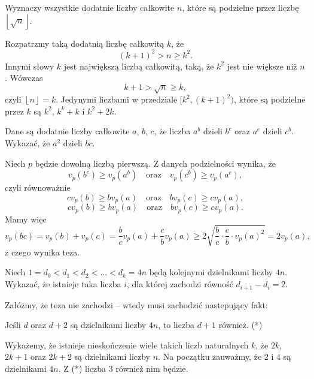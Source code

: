 \newpage
{}

\begin{problem}{1}
	Wyznaczy wszystkie dodatnie liczby całkowite $n$, które są podzielne przez liczbę~$\left\lfloor \sqrt{n} \right\rfloor$.
\end{problem}


\noindent
Rozpatrzmy taką dodatnią liczbę całkowitą $k$, że
\[
	(k + 1)^2 > n \geqslant k^2.
\]
Innymi słowy $k$ jest największą liczbą całkowitą, taką, że $k^2$ jest nie większe niż $n$. Wówczas
\[
	k + 1 > \sqrt{n} \geqslant k,
\]
czyli $\left\lfloor n \right\rfloor = k$. Jedynymi liczbami w przedziale $[k^2, (k + 1)^2)$, które są podzielne przez $k$ są $k^2$, $k^k + k$ i $k^2 + 2k$.


\begin{problem}{2}
	Dane są dodatnie liczby całkowite $a$, $b$, $c$, że liczba $a^b$ dzieli $b^c$ oraz $a^c$ dzieli $c^b$. Wykazać, że $a^2$ dzieli $bc$.
\end{problem}

\noindent
Niech $p$ będzie dowolną liczbą pierwszą.
Z danych podzielności wynika, że
\[
	v_p(b^c) \geqslant v_p(a^b) \quad \text{oraz} \quad v_p(c^b) \geqslant v_p(a^c),
\]
czyli równoważnie
\[
	cv_p(b) \geqslant bv_p(a) \quad \text{oraz} \quad bv_p(c) \geqslant cv_p(a),
\]
\[
	cv_p(b) \geqslant bv_p(a) \quad \text{oraz} \quad bv_p(c) \geqslant cv_p(a).
\]
Mamy więc
\[
	v_p(bc) = v_p(b) + v_p(c) = \frac{b}{c}v_p(a) +  \frac{c}{b}v_p(a) \geqslant 2\sqrt{\frac{b}{c} \cdot \frac{c}{b} \cdot v_p(a)^2} = 2v_p(a),
\]
z czego wynika teza.


\begin{problem}{3}
	Niech $1 = d_0 < d_1 < d_2 < ... < d_k = 4n$ będą kolejnymi dzielnikami liczby $4n$. Wykazać, że istnieje taka liczba $i$, dla której zachodzi równość $d_{i + 1} - d_i = 2$.
\end{problem}

\noindent
Załóżmy, że teza nie zachodzi -- wtedy musi zachodzić nastepujący fakt:
\begin{center} 
	Jeśli $d$ oraz $d + 2$ są dzielnikami liczby $4n$, to liczba $d + 1$ również. (*)
\end{center}
Wykażemy, że istnieje nieskończenie wiele takich liczb naturalnych $k$, że $2k$, $2k + 1$ oraz $2k + 2$ są dzielnikami liczby $n$. Na początku zauważmy, że $2$ i $4$ są dzielnikami $4n$. Z (*) liczba $3$ również nim będzie. 

